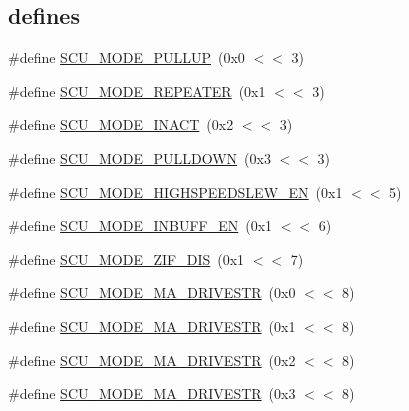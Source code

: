 \subsection*{\textquotesingle{}defines\textquotesingle{}}
\begin{DoxyCompactItemize}
\item 
\#define \hyperlink{group___s_c_u__18_x_x__43_x_x_gae75af2f0fdc362837d997ad5613d4a59}{S\+C\+U\+\_\+\+M\+O\+D\+E\+\_\+\+P\+U\+L\+L\+UP}~(0x0 $<$$<$ 3)
\item 
\#define \hyperlink{group___s_c_u__18_x_x__43_x_x_gac20d21e00fdd121d25725066cd02c41f}{S\+C\+U\+\_\+\+M\+O\+D\+E\+\_\+\+R\+E\+P\+E\+A\+T\+ER}~(0x1 $<$$<$ 3)
\item 
\#define \hyperlink{group___s_c_u__18_x_x__43_x_x_ga9e19fc80ad4c70d25069566be9dccf53}{S\+C\+U\+\_\+\+M\+O\+D\+E\+\_\+\+I\+N\+A\+CT}~(0x2 $<$$<$ 3)
\item 
\#define \hyperlink{group___s_c_u__18_x_x__43_x_x_gad9c9eb3ee857ec8d0917d257db190e79}{S\+C\+U\+\_\+\+M\+O\+D\+E\+\_\+\+P\+U\+L\+L\+D\+O\+WN}~(0x3 $<$$<$ 3)
\item 
\#define \hyperlink{group___s_c_u__18_x_x__43_x_x_gaae9b7437fda7df4f7e0266d62df1ead1}{S\+C\+U\+\_\+\+M\+O\+D\+E\+\_\+\+H\+I\+G\+H\+S\+P\+E\+E\+D\+S\+L\+E\+W\+\_\+\+EN}~(0x1 $<$$<$ 5)
\item 
\#define \hyperlink{group___s_c_u__18_x_x__43_x_x_ga66123729d389bc3191481392d4063290}{S\+C\+U\+\_\+\+M\+O\+D\+E\+\_\+\+I\+N\+B\+U\+F\+F\+\_\+\+EN}~(0x1 $<$$<$ 6)
\item 
\#define \hyperlink{group___s_c_u__18_x_x__43_x_x_ga240a8e7d216587a3dcb1989274cb73a8}{S\+C\+U\+\_\+\+M\+O\+D\+E\+\_\+\+Z\+I\+F\+\_\+\+D\+IS}~(0x1 $<$$<$ 7)
\item 
\#define \hyperlink{group___s_c_u__18_x_x__43_x_x_gafc1e75b357677ff26cef511c0db63024}{S\+C\+U\+\_\+\+M\+O\+D\+E\+\_\+M\+A\+\_\+\+D\+R\+I\+V\+E\+S\+TR}~(0x0 $<$$<$ 8)
\item 
\#define \hyperlink{group___s_c_u__18_x_x__43_x_x_gad8cd05fe91f6618f288a6a44a04b0f54}{S\+C\+U\+\_\+\+M\+O\+D\+E\+\_\+M\+A\+\_\+\+D\+R\+I\+V\+E\+S\+TR}~(0x1 $<$$<$ 8)
\item 
\#define \hyperlink{group___s_c_u__18_x_x__43_x_x_gadf7d955c410140acacca5c0223420f59}{S\+C\+U\+\_\+\+M\+O\+D\+E\+\_\+M\+A\+\_\+\+D\+R\+I\+V\+E\+S\+TR}~(0x2 $<$$<$ 8)
\item 
\#define \hyperlink{group___s_c_u__18_x_x__43_x_x_ga6d08e27351b19971ac5d8dcd3a73f635}{S\+C\+U\+\_\+\+M\+O\+D\+E\+\_\+M\+A\+\_\+\+D\+R\+I\+V\+E\+S\+TR}~(0x3 $<$$<$ 8)
\item 
$$
\end{DoxyCompactItemize}
